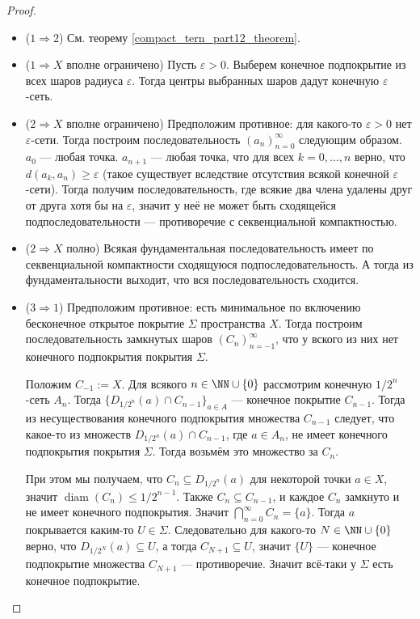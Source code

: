 \documentclass[12pt,a4paper]{article}
\DeclareMathOperator{\diam}{diam}
\begin{document}
    \begin{proof}\ 
        \begin{itemize}
            \item ($1 \Rightarrow 2$) См. теорему \ref{compact_tern_part12_theorem}.
            \item ($1 \Rightarrow X$ вполне ограничено) Пусть $\varepsilon > 0$. Выберем конечное подпокрытие из всех шаров радиуса $\varepsilon$. Тогда центры выбранных шаров дадут конечную $\varepsilon$-сеть.
            \item ($2 \Rightarrow X$ вполне ограничено) Предположим противное: для какого-то $\varepsilon > 0$ нет $\varepsilon$-сети. Тогда построим последовательность $(a_n)_{n=0}^\infty$ следующим образом. $a_0$ --- любая точка. $a_{n+1}$ --- любая точка, что для всех $k = 0, \dots, n$ верно, что $d(a_k, a_n) \geqslant \varepsilon$ (такое существует вследствие отсутствия всякой конечной $\varepsilon$-сети). Тогда получим последовательность, где всякие два члена удалены друг от друга хотя бы на $\varepsilon$, значит у неё не может быть сходящейся подпоследовательности --- противоречие с секвенциальной компактностью.
            \item ($2 \Rightarrow X$ полно) Всякая фундаментальная последовательность имеет по секвенциальной компактности сходящуюся подпоследовательность. А тогда из фундаментальности выходит, что вся последовательность сходится.
            \item ($3 \Rightarrow 1$) Предположим противное: есть минимальное по включению бесконечное открытое покрытие $\Sigma$ пространства $X$. Тогда построим последовательность замкнутых шаров $(C_n)_{n=-1}^\infty$, что у вского из них нет конечного подпокрытия покрытия $\Sigma$.
            
            Положим $C_{-1} := X$. Для всякого $n \in \NN \cup \{0\}$ рассмотрим конечную $1/2^n$-сеть $A_n$. Тогда $\{D_{1/2^n}(a) \cap C_{n-1}\}_{a \in A}$ --- конечное покрытие $C_{n-1}$. Тогда из несуществования конечного подпокрытия множества $C_{n-1}$ следует, что какое-то из множеств $D_{1/2^n}(a) \cap C_{n-1}$, где $a \in A_n$, не имеет конечного подпокрытия покрытия $\Sigma$. Тогда возьмём это множество за $C_n$.

            При этом мы получаем, что $C_n \subseteq D_{1/2^n}(a)$ для некоторой точки $a \in X$, значит $\diam(C_n) \leqslant 1/2^{n-1}$. Также $C_n \subseteq C_{n-1}$, и каждое $C_n$ замкнуто и не имеет конечного подпокрытия. Значит $\bigcap_{n=0}^\infty C_n = \{a\}$. Тогда $a$ покрывается каким-то $U \in \Sigma$. Следовательно для какого-то $N \in \NN \cup \{0\}$ верно, что $D_{1/2^N}(a) \subseteq U$, а тогда $C_{N+1} \subseteq U$, значит $\{U\}$ --- конечное подпокрытие множества $C_{N+1}$ --- противоречие. Значит всё-таки у $\Sigma$ есть конечное подпокрытие.
        \end{itemize}
    \end{proof}
\end{document}
